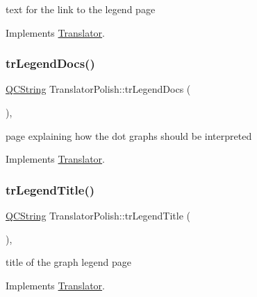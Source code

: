text for the link to the legend page 

Implements \mbox{\hyperlink{class_translator}{Translator}}.

\mbox{\label{class_translator_polish_a0b2b7c31dea5cec7a2419404276e65f2}} 
\subsubsection{\texorpdfstring{trLegendDocs()}{trLegendDocs()}}
{\footnotesize\ttfamily \mbox{\hyperlink{class_q_c_string}{Q\+C\+String}} Translator\+Polish\+::tr\+Legend\+Docs (\begin{DoxyParamCaption}{ }\end{DoxyParamCaption})\hspace{0.3cm}{\ttfamily [inline]}, {\ttfamily [virtual]}}

page explaining how the dot graph\textquotesingle{}s should be interpreted 

Implements \mbox{\hyperlink{class_translator}{Translator}}.

\mbox{\label{class_translator_polish_ab03d82c93f5ba3eb12ce7dcc2481249f}} 
\subsubsection{\texorpdfstring{trLegendTitle()}{trLegendTitle()}}
{\footnotesize\ttfamily \mbox{\hyperlink{class_q_c_string}{Q\+C\+String}} Translator\+Polish\+::tr\+Legend\+Title (\begin{DoxyParamCaption}{ }\end{DoxyParamCaption})\hspace{0.3cm}{\ttfamily [inline]}, {\ttfamily [virtual]}}

title of the graph legend page 

Implements \mbox{\hyperlink{class_translator}{Translator}}.

\mbox{\label{class_translator_polish_a75a43fcd1a1927285d3cf31c1525bb82}} 
